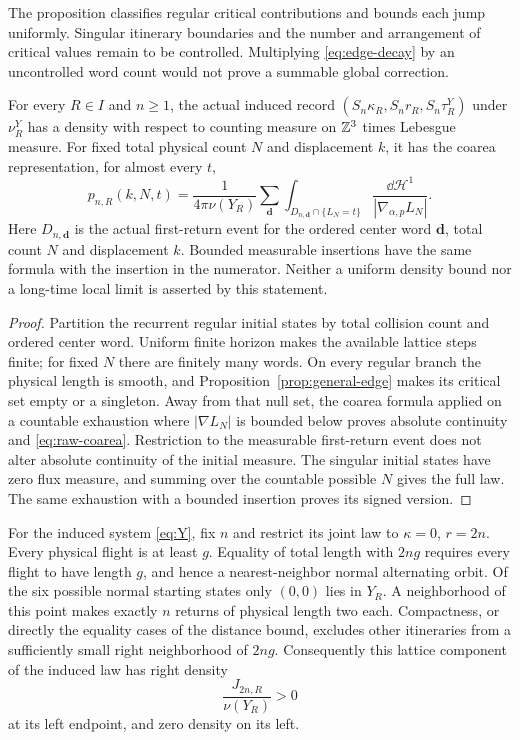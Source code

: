 The proposition classifies regular critical contributions and bounds each jump uniformly. Singular itinerary boundaries and the number and arrangement of critical values remain to be controlled. Multiplying \eqref{eq:edge-decay} by an uncontrolled word count would not prove a summable global correction.

\begin{corollary}\label{cor:raw-density}
For every $R\in I$ and $n\ge1$, the actual induced record
$(S_n\kappa_R,S_n r_R,S_n\tau_R^Y)$ under $\nu_R^Y$ has a density with respect to counting measure on $\mathbb Z^3$ times Lebesgue measure. For fixed total physical count $N$ and displacement $k$, it has the coarea representation, for almost every $t$,
\begin{equation}\label{eq:raw-coarea}
 p_{n,R}(k,N,t)=\frac1{4\pi\nu(Y_R)}
 \sum_{\mathbf d}\int_{D_{n,\mathbf d}\cap\{L_N=t\}}
              \frac{\dd\mathcal H^1}{|\nabla_{\alpha,p}L_N|}.
\end{equation}
Here $D_{n,\mathbf d}$ is the actual first-return event for the ordered center word $\mathbf d$, total count $N$ and displacement $k$. Bounded measurable insertions have the same formula with the insertion in the numerator. Neither a uniform density bound nor a long-time local limit is asserted by this statement.
\end{corollary}
\begin{proof}
Partition the recurrent regular initial states by total collision count and ordered center word. Uniform finite horizon makes the available lattice steps finite; for fixed $N$ there are finitely many words. On every regular branch the physical length is smooth, and Proposition~\ref{prop:general-edge} makes its critical set empty or a singleton. Away from that null set, the coarea formula applied on a countable exhaustion where $|\nabla L_N|$ is bounded below proves absolute continuity and \eqref{eq:raw-coarea}. Restriction to the measurable first-return event does not alter absolute continuity of the initial measure. The singular initial states have zero flux measure, and summing over the countable possible $N$ gives the full law. The same exhaustion with a bounded insertion proves its signed version.
\end{proof}

For the induced system \eqref{eq:Y}, fix $n$ and restrict its joint law to $\kappa=0$, $r=2n$. Every physical flight is at least $g$. Equality of total length with $2ng$ requires every flight to have length $g$, and hence a nearest-neighbor normal alternating orbit. Of the six possible normal starting states only $(0,0)$ lies in $Y_R$. A neighborhood of this point makes exactly $n$ returns of physical length two each. Compactness, or directly the equality cases of the distance bound, excludes other itineraries from a sufficiently small right neighborhood of $2ng$. Consequently this lattice component of the induced law has right density
\begin{equation}\label{eq:inducededge}
                \frac{J_{2n,R}}{\nu(Y_R)}>0
\end{equation}
at its left endpoint, and zero density on its left.

